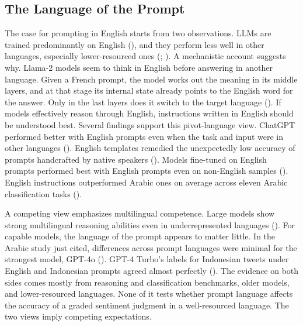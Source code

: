 \documentclass[
  man,
  floatsintext,
  longtable,
  nolmodern,
  notxfonts,
  notimes,
  colorlinks=true,linkcolor=blue,citecolor=blue,urlcolor=blue]{apa7}
\begin{document}
\subsection{The Language of the
Prompt}\label{the-language-of-the-prompt}

The case for prompting in English starts from two observations. LLMs are
trained predominantly on English (), and they perform less well in other languages,
especially lower-resourced ones
(;
). A
mechanistic account suggests why. Llama-2 models seem to think in
English before answering in another language. Given a French prompt, the
model works out the meaning in its middle layers, and at that stage its
internal state already points to the English word for the answer. Only
in the last layers does it switch to the target language
(). If models
effectively reason through English, instructions written in English
should be understood best. Several findings support this pivot-language
view. ChatGPT performed better with English prompts even when the task
and input were in other languages
().
English templates remedied the unexpectedly low accuracy of prompts
handcrafted by native speakers (). Models fine-tuned on English prompts performed best with
English prompts even on non-English samples
().
English instructions outperformed Arabic ones on average across eleven
Arabic classification tasks ().

A competing view emphasizes multilingual competence. Large models show
strong multilingual reasoning abilities even in underrepresented
languages ().
For capable models, the language of the prompt appears to matter little.
In the Arabic study just cited, differences across prompt languages were
minimal for the strongest model, GPT-4o
(). GPT-4
Turbo's labels for Indonesian tweets under English and Indonesian
prompts agreed almost perfectly
(). The
evidence on both sides comes mostly from reasoning and classification
benchmarks, older models, and lower-resourced languages. None of it
tests whether prompt language affects the accuracy of a graded sentiment
judgment in a well-resourced language. The two views imply competing
expectations.
\end{document}
